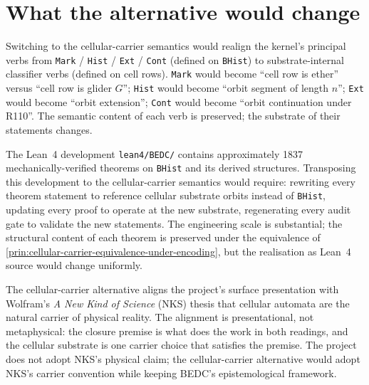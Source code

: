 \section{What the alternative would change}
\label{sec:cellular-carrier-what-would-change}


\begin{remark}
\label{rem:cellular-carrier-kernel-verb-realignment}
Switching to the cellular-carrier semantics would realign the kernel's principal verbs from \texttt{Mark} / \texttt{Hist} / \texttt{Ext} / \texttt{Cont} (defined on \texttt{BHist}) to substrate-internal classifier verbs (defined on cell rows). \texttt{Mark} would become ``cell row is ether'' versus ``cell row is glider $G$''; \texttt{Hist} would become ``orbit segment of length $n$''; \texttt{Ext} would become ``orbit extension''; \texttt{Cont} would become ``orbit continuation under R110''. The semantic content of each verb is preserved; the substrate of their statements changes.
\end{remark}

\begin{remark}
\label{rem:cellular-carrier-library-transposition-cost}
The Lean~4 development \texttt{lean4/BEDC/} contains approximately 1837 mechanically-verified theorems on \texttt{BHist} and its derived structures. Transposing this development to the cellular-carrier semantics would require: rewriting every theorem statement to reference cellular substrate orbits instead of \texttt{BHist}, updating every proof to operate at the new substrate, regenerating every audit gate to validate the new statements. The engineering scale is substantial; the structural content of each theorem is preserved under the equivalence of \autoref{prin:cellular-carrier-equivalence-under-encoding}, but the realisation as Lean~4 source would change uniformly.
\end{remark}

\begin{remark}
\label{rem:cellular-carrier-aliasing-nks}
The cellular-carrier alternative aligns the project's surface presentation with Wolfram's \emph{A New Kind of Science} (NKS) thesis that cellular automata are the natural carrier of physical reality. The alignment is presentational, not metaphysical: the closure premise is what does the work in both readings, and the cellular substrate is one carrier choice that satisfies the premise. The project does not adopt NKS's physical claim; the cellular-carrier alternative would adopt NKS's carrier convention while keeping BEDC's epistemological framework.
\end{remark}


